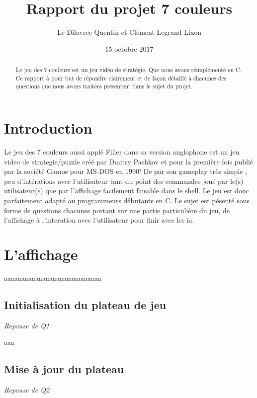\documentclass[a4paper,11pt]{article}
\begin{document}
\title{Rapport du projet 7 couleurs}

\author{Le Dilavrec Quentin et Clément Legrand Lixon}

\date{15 octobre 2017}

\maketitle

\begin{abstract}
Le jeu des 7 couleurs est un jeu vidéo de stratégie.
Que nous avons réimplémenté en C. Ce rapport à pour but de répondre clairement et de façon détaillé à chacunes des questions  que nous avons traitées présentent dans le sujet du projet.
\end{abstract}


\section{Introduction}
Le jeu des 7 couleurs aussi applé Filler dans sa version anglophone est un jeu video de strategie/puzzle créé par Dmitry Pashkov et pour la première fois publié par la société Gamos pour MS-DOS en 1990! De par son gameplay très simple , peu d'intérations avec l'utilisateur tant du point des commandes joué par le(s) utilisateur(s) que par l'affichage facilement faisable dans le shell. Le jeu est donc parfaitement adapté au programmeurs débutants en C. Le sujet est pésenté sous forme de questions chacunes portant sur une partie particulière du jeu, de l'affichage à l'interation avec l'utilisateur pour finir avec les ia.


\section{L'affichage}

aaaaaaaaaaaaaaaaaaaaaaaaaaaa

\subsection{Initialisation du plateau de jeu}
\emph{Reponse de Q1}

aaa

\subsection{Mise à jour du plateau}
\emph{Reponse de Q2}
\end{document}
